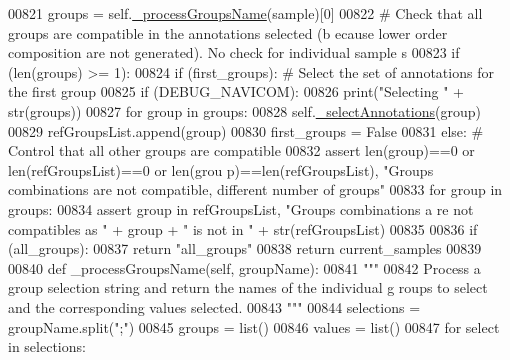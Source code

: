 \begin{DoxyCode}
00821             groups = self.\hyperlink{classnavicom_1_1navicom_1_1NaviCom_a1b8f14be167905533ab7e18294dd9100}{_processGroupsName}(sample)[0]
00822             \textcolor{comment}{# Check that all groups are compatible in the annotations selected (b
      ecause lower order composition are not generated). No check for individual sample
      s}
00823             \textcolor{keywordflow}{if} (len(groups) >= 1):
00824                 \textcolor{keywordflow}{if} (first\_groups): \textcolor{comment}{# Select the set of annotations for the first 
      group}
00825                     \textcolor{keywordflow}{if} (DEBUG\_NAVICOM):
00826                         \textcolor{keywordflow}{print}(\textcolor{stringliteral}{"Selecting "} + str(groups))
00827                     \textcolor{keywordflow}{for} group \textcolor{keywordflow}{in} groups:
00828                         self.\hyperlink{classnavicom_1_1navicom_1_1NaviCom_a7e1aa831f14b151b7b5787c8b6128cef}{_selectAnnotations}(group) 
00829                         refGroupsList.append(group)
00830                         first\_groups = \textcolor{keyword}{False}
00831                 \textcolor{keywordflow}{else}: \textcolor{comment}{# Control that all other groups are compatible}
00832                         \textcolor{keyword}{assert} len(group)==0 \textcolor{keywordflow}{or} len(refGroupsList)==0 \textcolor{keywordflow}{or} len(grou
      p)==len(refGroupsList), \textcolor{stringliteral}{"Groups combinations are not compatible, different number
       of groups"}
00833                         \textcolor{keywordflow}{for} group \textcolor{keywordflow}{in} groups:
00834                             \textcolor{keyword}{assert} group \textcolor{keywordflow}{in} refGroupsList, \textcolor{stringliteral}{"Groups combinations a
      re not compatibles as "} + group + \textcolor{stringliteral}{" is not in "} + str(refGroupsList)
00835 
00836         \textcolor{keywordflow}{if} (all\_groups):
00837             \textcolor{keywordflow}{return} \textcolor{stringliteral}{"all\_groups"}
00838         \textcolor{keywordflow}{return} current\_samples
00839 
00840     \textcolor{keyword}{def }\_processGroupsName(self, groupName):
00841         \textcolor{stringliteral}{"""}
00842 \textcolor{stringliteral}{        Process a group selection string and return the names of the individual g
      roups to select and the corresponding values selected.}
00843 \textcolor{stringliteral}{        """}
00844         selections = groupName.split(\textcolor{stringliteral}{";"})
00845         groups = list()
00846         values = list()
00847         \textcolor{keywordflow}{for} select \textcolor{keywordflow}{in} selections:

\end{DoxyCode}
